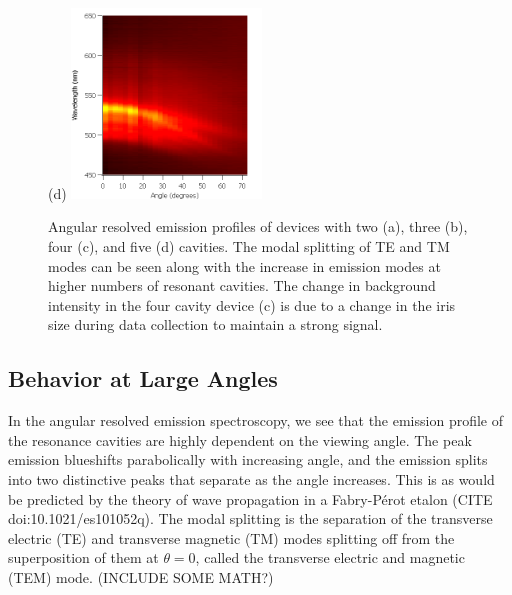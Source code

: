 \documentclass{report}
\begin{document}
\begin{figure}[h!]
            (d)
            \includegraphics[width=0.45\textwidth]{images/n5_heatmap.png}
            \caption{Angular resolved emission profiles of devices with two (a), three (b), four (c), and five (d) cavities. The modal splitting of TE and TM modes can be seen along with the increase in emission modes at higher numbers of resonant cavities. The change in background intensity in the four cavity device (c) is due to a change in the iris size during data collection to maintain a strong signal.}
            \label{fig:heatmaps}
		\end{figure}
    
        \subsection{Behavior at Large Angles} \label{largeAngle}
		In the angular resolved emission spectroscopy, we see that the emission profile of the resonance cavities are highly dependent on the viewing angle. The peak emission blueshifts parabolically with increasing angle, and the emission splits into two distinctive peaks that separate as the angle increases. This is as would be predicted by the theory of wave propagation in a Fabry-P\'erot etalon (CITE doi:10.1021/es101052q). The modal splitting is the separation of the transverse electric (TE) and transverse magnetic (TM) modes splitting off from the superposition of them at $\theta=0$, called the transverse electric and magnetic (TEM) mode. (INCLUDE SOME MATH?)

    
\end{document}
